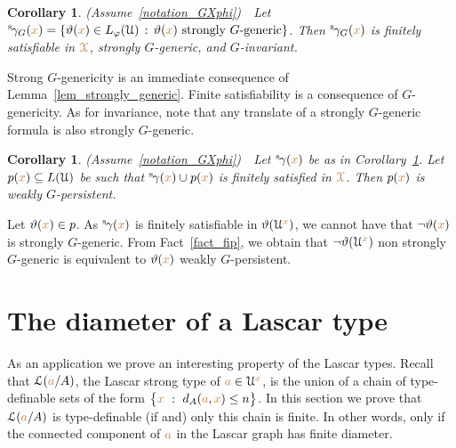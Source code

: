 \documentclass[10pt,openany]{amsproc}
\makeatletter
\def\X{\EuScript X}
\def\U{\EuScript U}
\def\Ll{\EuScript L}
\def\theta{\vartheta}
\def\phi{\varphi}
\newcounter{thm}
\theoremstyle{mio}
\newtheorem{corollary}[thm]{Corollary}\tcolorboxenvironment{corollary}{mythm}
\providecommand{\proofNameStyle}{\bfseries}
\renewenvironment{proof}[1][\proofname]{\par
  \pushQED{\qed}%
  \normalfont%
  \trivlist
  \item[\hskip\labelsep
        \proofNameStyle
    #1\@addpunct{.}]\ignorespaces
}{%
  \popQED\endtrivlist\@endpefalse
}
\def\mr{\color{brown}}
\def\mrX{{\mr\X}}
\makeatother
\begin{document}
\begin{corollary}\label{corol_str_gen}
  (Assume~\ref{notation_GXphi})\ \  
  Let ${}^{\rm s}\kern-.2ex\gamma_G({\mr x})=\{\theta({\mr x})\in L_\phi(\U)\,:\, \theta({\mr x})\textrm{ strongly $G$-generic}\}$.
  Then ${}^{\rm s}\kern-.2ex\gamma_G({\mr x})$ is finitely satisfiable in $\mrX$, strongly $G$-generic, and $G$-invariant.
\end{corollary}

\begin{proof}
  Strong $G$-genericity is an immediate consequence of Lemma~\ref{lem_strongly_generic}.
  Finite satisfiability is a consequence of $G$-genericity.
  As for invariance, note that any translate of a strongly $G$-generic formula is also strongly $G$-generic.
\end{proof}

\begin{corollary}\label{corol_q_w_pers}
  (Assume~\ref{notation_GXphi})\ \  
  Let ${}^{\rm s}\kern-.2ex\gamma({\mr x})$ be as in Corollary~\ref{corol_str_gen}.
  Let $p({\mr x})\subseteq L(\U)$ be such that ${}^{\rm s}\kern-.2ex\gamma({\mr x})\cup p({\mr x})$ is finitely satisfied in $\mrX$.
  Then $p({\mr x})$ is weakly $G$-persistent.
\end{corollary}

\begin{proof}
  Let $\theta({\mr x})\in p$.
  As ${}^{\rm s}\kern-.2ex\gamma({\mr x})$ is finitely satisfiable in $\theta(\U^{\mr x})$, we cannot have that $\neg\theta({\mr x})$ is strongly $G$-generic.
  From Fact~\ref{fact_fip}, we obtain that $\neg\theta(\U^{\mr x})$ non strongly $G$-generic is equivalent to $\theta({\mr x})$ weakly $G$-persistent.
\end{proof}



\section{The diameter of a Lascar type}\label{newelski}

As an application we prove an interesting property of the Lascar types.
Recall that $\Ll({\mr a}/A)$, the Lascar strong type of ${\mr a}\in\U^{\mr x}$, is the union of a chain of type-definable sets of the form $\big\{{\mr x}\ :\ d_A({\mr a},{\mr x})\le n\big\}$.
In this section we prove that $\Ll({\mr a}/A)$ is type-definable (if and) only this chain is finite.
In other words, only if the connected component of ${\mr a}$ in the Lascar graph has finite diameter.
\end{document}
